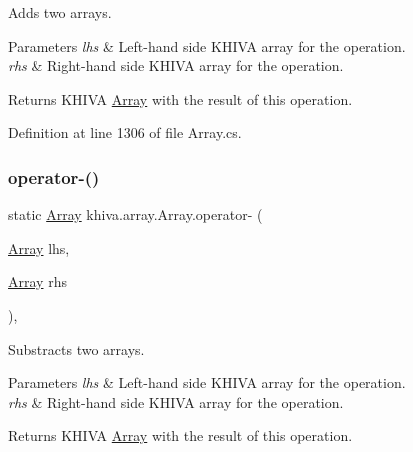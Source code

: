 Adds two arrays. 


\begin{DoxyParams}{Parameters}
{\em lhs} & Left-\/hand side K\+H\+I\+VA array for the operation.\\
\hline
{\em rhs} & Right-\/hand side K\+H\+I\+VA array for the operation.\\
\hline
\end{DoxyParams}
\begin{DoxyReturn}{Returns}
K\+H\+I\+VA \mbox{\hyperlink{classkhiva_1_1array_1_1_array}{Array}} with the result of this operation.
\end{DoxyReturn}


Definition at line 1306 of file Array.\+cs.

\mbox{\label{classkhiva_1_1array_1_1_array_a16054029322102ab9f9e7cea45430bcd}} 
\subsubsection{\texorpdfstring{operator-\/()}{operator-()}\hspace{0.1cm}{\footnotesize\ttfamily [1/2]}}
{\footnotesize\ttfamily static \mbox{\hyperlink{classkhiva_1_1array_1_1_array}{Array}} khiva.\+array.\+Array.\+operator-\/ (\begin{DoxyParamCaption}\item[{\mbox{\hyperlink{classkhiva_1_1array_1_1_array}{Array}}}]{lhs,  }\item[{\mbox{\hyperlink{classkhiva_1_1array_1_1_array}{Array}}}]{rhs }\end{DoxyParamCaption})\hspace{0.3cm}{\ttfamily [inline]}, {\ttfamily [static]}}



Substracts two arrays. 


\begin{DoxyParams}{Parameters}
{\em lhs} & Left-\/hand side K\+H\+I\+VA array for the operation.\\
\hline
{\em rhs} & Right-\/hand side K\+H\+I\+VA array for the operation.\\
\hline
\end{DoxyParams}
\begin{DoxyReturn}{Returns}
K\+H\+I\+VA \mbox{\hyperlink{classkhiva_1_1array_1_1_array}{Array}} with the result of this operation.
\end{DoxyReturn}


